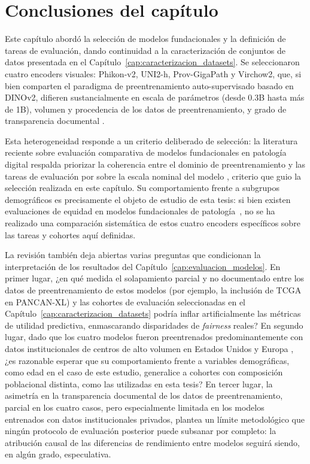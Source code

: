 \section{Conclusiones del capítulo}

Este capítulo abordó la selección de modelos fundacionales y la definición
de tareas de evaluación, dando continuidad a la caracterización de conjuntos
de datos presentada en el Capítulo~\ref{cap:caracterizacion_datasets}. Se seleccionaron
cuatro encoders visuales: Phikon-v2, UNI2-h, Prov-GigaPath y Virchow2, que,
si bien comparten el paradigma de preentrenamiento auto-supervisado basado en
DINOv2, difieren sustancialmente en escala de parámetros (desde 0.3B hasta
más de 1B), volumen y procedencia de los datos de preentrenamiento, y grado
de transparencia documental \citep{filiot2024phikonv2,chen2024uni,xu2024provgigapath,vorontsov2024virchow}.

Esta heterogeneidad responde a un criterio deliberado de selección: la literatura
reciente sobre evaluación comparativa de modelos fundacionales en patología digital
respalda priorizar la coherencia entre el dominio de preentrenamiento y las tareas
de evaluación por sobre la escala nominal del modelo \citep{filiot2024phikonv2},
criterio que guio la selección realizada en este capítulo. Su comportamiento frente
a subgrupos demográficos es precisamente el objeto de estudio de esta tesis: si bien
existen evaluaciones de equidad en modelos fundacionales de patología~\parencite{lin2025fairpath, huang2025flex},
no se ha realizado una comparación sistemática de estos cuatro encoders específicos
sobre las tareas y cohortes aquí definidas.

La revisión también deja abiertas varias preguntas que condicionan la
interpretación de los resultados del Capítulo~\ref{cap:evaluacion_modelos}. En primer
lugar, ¿en qué medida el solapamiento parcial y no documentado entre los
datos de preentrenamiento de estos modelos (por ejemplo, la inclusión de
TCGA en PANCAN-XL) y las cohortes de evaluación seleccionadas en el
Capítulo~\ref{cap:caracterizacion_datasets} podría inflar artificialmente las métricas de
utilidad predictiva, enmascarando disparidades de \textit{fairness} reales?
En segundo lugar, dado que los cuatro modelos fueron preentrenados
predominantemente con datos institucionales de centros de alto volumen en
Estados Unidos y Europa \citep{chen2024uni,xu2024provgigapath,vorontsov2024virchow},
¿es razonable esperar que su comportamiento frente a variables demográficas, como edad en el caso de este estudio, generalice a cohortes con composición
poblacional distinta, como las utilizadas en esta tesis? En tercer lugar,
la asimetría en la transparencia documental de los datos de preentrenamiento,
parcial en los cuatro casos, pero especialmente limitada en los modelos
entrenados con datos institucionales privados, plantea un límite
metodológico que ningún protocolo de evaluación posterior puede subsanar por
completo: la atribución causal de las diferencias de rendimiento entre
modelos seguirá siendo, en algún grado, especulativa.

